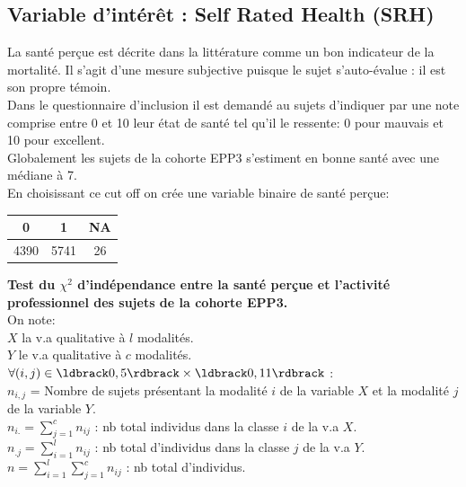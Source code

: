 \documentclass{book}
\begin{document}
\subsection{Variable d'intérêt : Self Rated Health (SRH)}
\noindent
La santé perçue est décrite dans la littérature comme un bon indicateur de la mortalité. Il s'agit d'une mesure subjective puisque le sujet s'auto-évalue : il est son propre témoin.\\
Dans le questionnaire d'inclusion il est demandé au sujets d'indiquer par une note comprise entre 0 et 10 leur état de santé tel qu'il le ressente: 0 pour mauvais et 10 pour excellent.\\
\noindent
Globalement les sujets de la cohorte EPP3 s'estiment en bonne santé avec une médiane à 7.\\ En choisissant ce cut off on crée une variable binaire de santé perçue:

\begin{center}

\setlength\arrayrulewidth{.1pt}
\begin{tabular}{|c|c|c|}
\hline
  0  &  1& NA \\
  \hline
  \hline 
4390& 5741&   26\\
\hline 
\end{tabular}
\end{center}

\noindent
\textbf{Test du $\chi^2$ d'indépendance entre la santé perçue et l'activité professionnel des sujets de la cohorte EPP3.}\\

\noindent
On note:\\

\noindent
$X$ la v.a qualitative à $l$ modalités.\\
$Y$ le v.a qualitative à $c$ modalités.\\

\noindent
$\forall (i,j) \in \ldbrack 0,5 \rdbrack \times \ldbrack 0,11 \rdbrack$ :\\
$n_{i,j}$ = Nombre de sujets présentant la modalité $i$ de la variable $X$ et la modalité $j$ de la variable $Y$.\\
$n_{i.} = \sum_{j = 1} ^c n_{ij}$ : nb total individus dans la classe $i$ de la v.a $X$.\\
$n_{.j} = \sum_{i = 1} ^l n_{ij}$ : nb total d'individus dans la classe $j$ de la v.a $Y$.\\
\noindent
$n = \sum _{i = 1} ^ l \sum_{j = 1} ^c n_{ij}$ : nb total d'individus.\\
\end{document}
